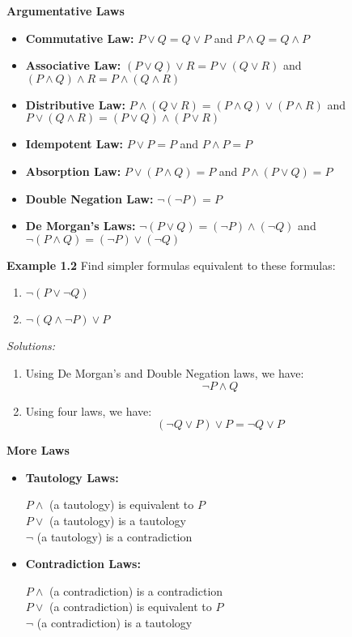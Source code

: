\documentclass[11pt]{article}
\begin{document}
\textbf{Argumentative Laws}

\begin{itemize}
    \item \textbf{Commutative Law:} \(P \vee Q = Q \vee P\) and \(P \wedge Q = Q \wedge P\)
    \item \textbf{Associative Law:} \((P \vee Q) \vee R = P \vee (Q \vee R)\) and \((P \wedge Q) \wedge R = P \wedge (Q \wedge R)\)
    \item \textbf{Distributive Law:} \(P \wedge (Q \vee R) = (P \wedge Q) \vee (P \wedge R)\) and \(P \vee (Q \wedge R) = (P \vee Q) \wedge (P \vee R)\)
    \item \textbf{Idempotent Law:} \(P \vee P = P\) and \(P \wedge P = P\)
    \item \textbf{Absorption Law:} \(P \vee (P \wedge Q) = P\) and \(P \wedge (P \vee Q) = P\)
    \item \textbf{Double Negation Law:} \(\neg(\neg P) = P\)
    \item \textbf{De Morgan's Laws:} \(\neg(P \vee Q) = (\neg P) \wedge (\neg Q)\) and \(\neg(P \wedge Q) = (\neg P) \vee (\neg Q)\)
\end{itemize}

\textbf{Example 1.2} Find simpler formulas equivalent to these formulas:

\begin{enumerate}
    \item \(\neg (P \vee \neg Q)\)
    \item \(\neg (Q \wedge \neg P) \vee P\)
\end{enumerate}

\textit{Solutions:}

\begin{enumerate}
    \item Using De Morgan's and Double Negation laws, we have:
    \[
        \neg P \wedge Q 
    \]
    \item Using four laws, we have:
    \[
        (\neg Q \vee P) \vee P = \neg Q \vee P
    \]
\end{enumerate}

\textbf{More Laws}

\begin{itemize}
    \item \textbf{Tautology Laws:} 
    \begin{center}
        \(P \wedge\) (a tautology) is equivalent to \(P\) \\
        \(P \vee\) (a tautology) is a tautology \\
        \(\neg\) (a tautology) is a contradiction \\
    \end{center}
    \item \textbf{Contradiction Laws:}
    \begin{center}
        \(P \wedge\) (a contradiction) is a contradiction \\
        \(P \vee\) (a contradiction) is equivalent to \(P\) \\
        \(\neg\) (a contradiction) is a tautology \\
    \end{center}
\end{itemize}
\end{document}

